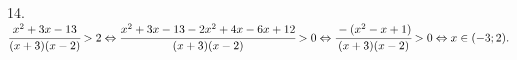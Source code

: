 14. $\cfrac{x^2+3x-13}{(x+3)(x-2)}>2 \Leftrightarrow \cfrac{x^2+3x-13-2x^2+4x-6x+12}{(x+3)(x-2)}>0\Leftrightarrow \cfrac{-(x^2-x+1)}{(x+3)(x-2)}>0
\Leftrightarrow x\in(-3;2).$\\
